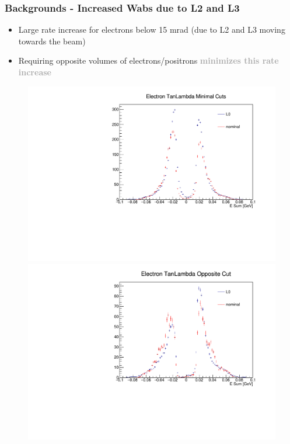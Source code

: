 \documentclass{beamer}
\begin{document}
\begin{frame}
\frametitle{Backgrounds - Increased Wabs due to L2 and L3}
\begin{itemize}
\item Large rate increase for electrons below 15 mrad (due to L2 and L3 moving towards the beam)
\item Requiring opposite volumes of electrons/positrons \textcolor{darkgray}{\textbf{minimizes this rate increase}}
\end{itemize}
\begin{figure}
\includegraphics[width=0.5\linewidth]{figs/eleLambda.pdf}
\includegraphics[width=0.5\linewidth]{figs/eleLambda_oppo.pdf}
\end{figure}

\end{frame}





\end{document}
